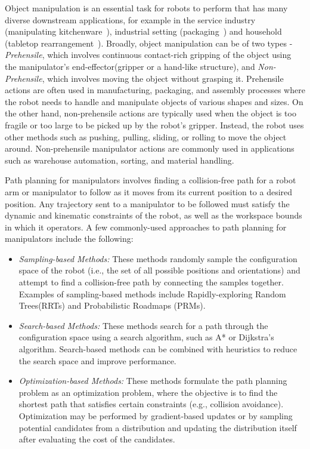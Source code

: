 Object manipulation is an essential task for robots to perform that has many diverse downstream applications, for example in the service industry (manipulating kitchenware~\cite{kitchen_arm}), industrial setting (packaging~\cite{industrial_arm}) and household (tabletop rearrangement~\cite{agarwal2022approaches}). Broadly, object manipulation can be of two types - \textit{Prehensile}, which involves continuous contact-rich gripping of the object using the manipulator's end-effector(gripper or a hand-like structure), and \textit{Non-Prehensile}, which involves moving the object without grasping it. Prehensile actions are often used in manufacturing, packaging, and assembly processes where the robot needs to handle and manipulate objects of various shapes and sizes. On the other hand, non-prehensile actions are typically used when the object is too fragile or too large to be picked up by the robot's gripper. Instead, the robot uses other methods such as pushing, pulling, sliding, or rolling to move the object around. Non-prehensile manipulator actions are commonly used in applications such as warehouse automation, sorting, and material handling.

Path planning for manipulators involves finding a collision-free path for a robot arm or manipulator to follow as it moves from its current position to a desired position. Any trajectory sent to a manipulator to be followed must satisfy the dynamic and kinematic constraints of the robot, as well as the workspace bounds in which it operators. A few commonly-used approaches to path planning for manipulators include the following:

\begin{itemize}
    \item \textit{Sampling-based Methods:} These methods randomly sample the configuration space of the robot (i.e., the set of all possible positions and orientations) and attempt to find a collision-free path by connecting the samples together. Examples of sampling-based methods include Rapidly-exploring Random Trees(RRTs)\cite{RRT-og} and Probabilistic Roadmaps (PRMs)\cite{PRM}.
    \item \textit{Search-based Methods:} These methods search for a path through the configuration space using a search algorithm, such as A*\cite{A*} or Dijkstra's algorithm. Search-based methods can be combined with heuristics to reduce the search space and improve performance.
    \item \textit{Optimization-based Methods:} These methods formulate the path planning problem as an optimization problem, where the objective is to find the shortest path that satisfies certain constraints (e.g., collision avoidance). Optimization may be performed by gradient-based updates or by sampling potential candidates from a distribution and updating the distribution itself after evaluating the cost of the candidates. 

\end{itemize}

